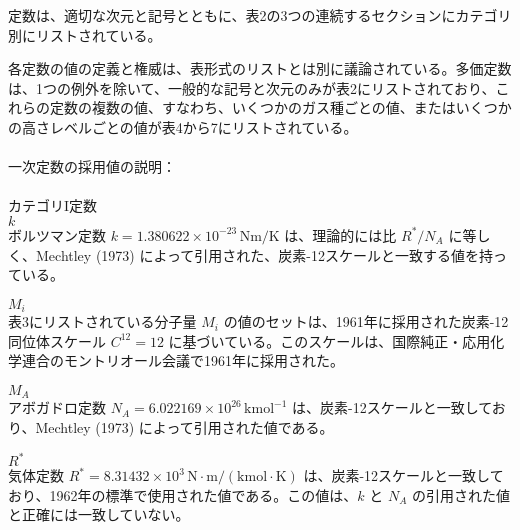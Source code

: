 \documentclass{article}
\begin{document}
定数は、適切な次元と記号とともに、表2の3つの連続するセクションにカテゴリ別にリストされている。

各定数の値の定義と権威は、表形式のリストとは別に議論されている。多価定数は、1つの例外を除いて、一般的な記号と次元のみが表2にリストされており、これらの定数の複数の値、すなわち、いくつかのガス種ごとの値、またはいくつかの高さレベルごとの値が表4から7にリストされている。
\\\\
一次定数の採用値の説明：
\\\\
カテゴリI定数\\

$k$\\
ボルツマン定数 $k = 1.380622 \times 10^{-23} \, \mathrm{Nm/K}$ は、理論的には比 ${R^*}/{N_A}$ に等しく、Mechtley (1973) によって引用された、炭素-12スケールと一致する値を持っている。

$M_i$\\
表3にリストされている分子量 $M_i$ の値のセットは、1961年に採用された炭素-12同位体スケール $C^{12} = 12$ に基づいている。このスケールは、国際純正・応用化学連合のモントリオール会議で1961年に採用された。

$M_A$\\
アボガドロ定数 $N_A = 6.022169 \times 10^{26} \, \mathrm{kmol}^{-1}$ は、炭素-12スケールと一致しており、Mechtley (1973) によって引用された値である。

$R^{*}$\\
気体定数 $R^* = 8.31432 \times 10^{3} \, \mathrm{N \cdot m / (kmol \cdot K)}$ は、炭素-12スケールと一致しており、1962年の標準で使用された値である。この値は、$k$ と $N_A$ の引用された値と正確には一致していない。
\end{document}

